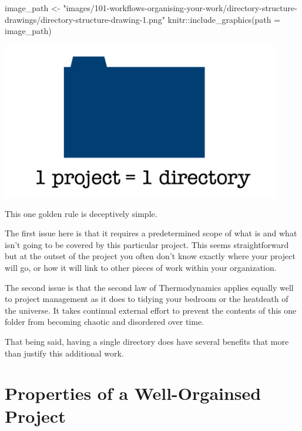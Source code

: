 \documentclass[
  letterpaper,
  DIV=11,
  numbers=noendperiod]{scrreprt}
\newenvironment{Shaded}{\begin{snugshade}}{\end{snugshade}}
\newcommand{\AttributeTok}[1]{\textcolor[rgb]{0.40,0.45,0.13}{#1}}
\newcommand{\FunctionTok}[1]{\textcolor[rgb]{0.28,0.35,0.67}{#1}}
\newcommand{\NormalTok}[1]{\textcolor[rgb]{0.00,0.23,0.31}{#1}}
\newcommand{\OtherTok}[1]{\textcolor[rgb]{0.00,0.23,0.31}{#1}}
\newcommand{\SpecialCharTok}[1]{\textcolor[rgb]{0.37,0.37,0.37}{#1}}
\newcommand{\StringTok}[1]{\textcolor[rgb]{0.13,0.47,0.30}{#1}}
\begin{document}
\begin{Shaded}
\begin{Highlighting}[]
\NormalTok{image\_path }\OtherTok{\textless{}{-}} \StringTok{"images/101{-}workflows{-}organising{-}your{-}work/directory{-}structure{-}drawings/directory{-}structure{-}drawing{-}1.png"}
\NormalTok{knitr}\SpecialCharTok{::}\FunctionTok{include\_graphics}\NormalTok{(}\AttributeTok{path =}\NormalTok{ image\_path)}
\end{Highlighting}
\end{Shaded}

\includegraphics[width=4.8in,height=\textheight]{images/101-workflows-organising-your-work/directory-structure-drawings/directory-structure-drawing-1.png}

This one golden rule is deceptively simple.

The first issue here is that it requires a predetermined scope of what
is and what isn't going to be covered by this particular project. This
seems straightforward but at the outset of the project you often don't
know exactly where your project will go, or how it will link to other
pieces of work within your organization.

The second issue is that the second law of Thermodynamics applies
equally well to project management as it does to tidying your bedroom or
the heatdeath of the universe. It takes continual external effort to
prevent the contents of this one folder from becoming chaotic and
disordered over time.

That being said, having a single directory does have several benefits
that more than justify this additional work.

\section{Properties of a Well-Orgainsed
Project}\label{properties-of-a-well-orgainsed-project}
\end{document}
